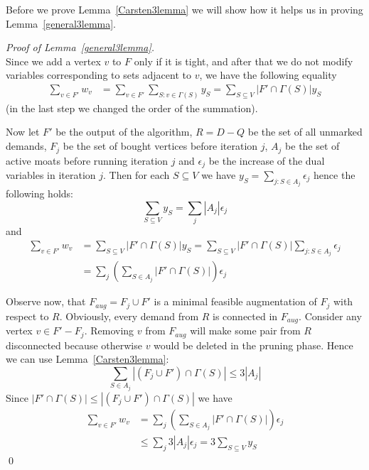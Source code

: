 Before we prove Lemma~\ref{Carsten3lemma} we will show how it helps us in proving Lemma~\ref{general3lemma}.\\
\begin{proof}[Proof of Lemma~\ref{general3lemma}]\\
Since we add a vertex $v$ to $F$ only if it is tight, and after that we do not modify variables corresponding to sets adjacent to $v$, we have the following equality
\begin{align*}
\sum_{v\in F'}w_v & = \sum_{v\in F'} \sum_{S:v\in\Gamma(S)}y_S = \sum_{S\subseteq V}|F' \cap \Gamma(S)|y_S
\end{align*}
(in the last step we changed the order of the summation).

Now let $F'$ be the output of the algorithm, $R=D-Q$ be the set of all unmarked demands, $F_j$ be the set of bought vertices before iteration $j$, $A_j$ be the set of active moats before running iteration $j$ and $\epsilon_j$ be the increase of the dual variables in iteration $j$. Then for each $S\subseteq V$ we have $y_S = \sum_{j:S \in A_j} \epsilon_j$ hence the following holds:
$$\sum_{S\subseteq V} y_S = \sum_j |A_j|\epsilon_j$$
and
\begin{align*}
\sum_{v\in F'}w_v & = \sum_{S\subseteq V}|F' \cap \Gamma(S)|y_S  = \sum_{S\subseteq V}|F' \cap \Gamma(S)|\sum_{j : S\in A_j}\epsilon_j\\
	& = \sum_j\left(\sum_{S\in A_j}|F' \cap \Gamma(S)|\right)\epsilon_j
\end{align*}

Observe now, that $F_{aug} = F_j \cup F'$ is a minimal feasible augmentation of $F_j$ with respect to $R$. Obviously, every demand from $R$ is connected in $F_{aug}$. Consider any vertex $v \in F' - F_j$. Removing $v$ from $F_{aug}$ will make some pair from $R$ disconnected because otherwise $v$ would be deleted in the pruning phase. Hence we can use Lemma~\ref{Carsten3lemma}:
$$\sum_{S\in{A_j}}|(F_j \cup F') \cap \Gamma(S)| \leq 3|A_j|$$
Since $|F' \cap \Gamma(S)| \leq |(F_j \cup F') \cap \Gamma(S)|$ we have
\begin{align*}
\sum_{v\in F'}w_v & = \sum_j\left(\sum_{S\in A_j}|F' \cap \Gamma(S)|\right)\epsilon_j\\
	& \leq \sum_j3|A_j|\epsilon_j = 3\sum_{S\subseteq V}y_S
\end{align*} \qed
\end{proof}

